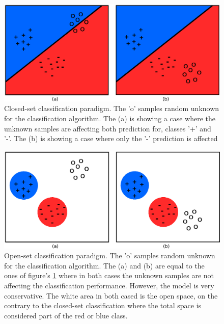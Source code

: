 \begin{figure}[t]
	\begin{center}
    	\includegraphics[scale=0.70]{Figures/closed-set_classification_schema.eps}
		\caption{Closed-set classification paradigm. The 'o' samples random unknown for the classification algorithm. The (a) is showing a case where the unknown samples are affecting both prediction for, classes '+' and '-'. The (b) is showing a case where only the '-' prediction is affected}
		\label{chap:openset:fig:closed_set_classification}
	\end{center}
\end{figure}


\begin{figure}[t]
	\begin{center}
    	\includegraphics[scale=0.70]{Figures/open-set_classification_schema.eps}
		\caption{Open-set classification paradigm. The 'o' samples random unknown for the classification algorithm. The (a) and (b) are equal to the ones of figure's \ref{chap:openset:fig:closed_set_classification} where in both cases the unknown samples are not affecting the classification performance. However, the model is very conservative. The white area in both cased is the open space, on the contrary to the closed-set classification where the total space is considered part of the red or blue class.}
		\label{chap:openset:fig:open_set_classification}
	\end{center}
\end{figure}

